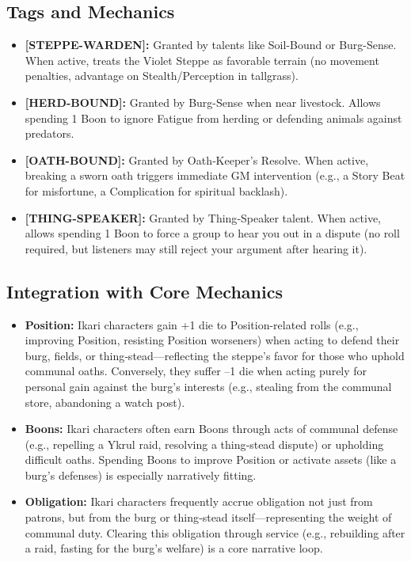 \documentclass[12pt]{article}
\begin{document}
\subsection{Tags and Mechanics}
\begin{itemize}[leftmargin=*]
  \item \textbf{[STEPPE-WARDEN]:} Granted by talents like Soil-Bound or Burg-Sense. When active, treats the Violet Steppe as favorable terrain (no movement penalties, advantage on Stealth/Perception in tallgrass).
  \item \textbf{[HERD-BOUND]:} Granted by Burg-Sense when near livestock. Allows spending 1 Boon to ignore Fatigue from herding or defending animals against predators.
  \item \textbf{[OATH-BOUND]:} Granted by Oath‑Keeper's Resolve. When active, breaking a sworn oath triggers immediate GM intervention (e.g., a Story Beat for misfortune, a Complication for spiritual backlash).
  \item \textbf{[THING-SPEAKER]:} Granted by Thing‑Speaker talent. When active, allows spending 1 Boon to force a group to hear you out in a dispute (no roll required, but listeners may still reject your argument after hearing it).
\end{itemize}

\subsection{Integration with Core Mechanics}
\begin{itemize}[leftmargin=*]
  \item \textbf{Position:} Ikari characters gain +1 die to Position-related rolls (e.g., improving Position, resisting Position worseners) when acting to defend their burg, fields, or thing‑stead---reflecting the steppe's favor for those who uphold communal oaths. Conversely, they suffer --1 die when acting purely for personal gain against the burg's interests (e.g., stealing from the communal store, abandoning a watch post).
  \item \textbf{Boons:} Ikari characters often earn Boons through acts of communal defense (e.g., repelling a Ykrul raid, resolving a thing‑stead dispute) or upholding difficult oaths. Spending Boons to improve Position or activate assets (like a burg's defenses) is especially narratively fitting.
  \item \textbf{Obligation:} Ikari characters frequently accrue obligation not just from patrons, but from the burg or thing‑stead itself---representing the weight of communal duty. Clearing this obligation through service (e.g., rebuilding after a raid, fasting for the burg's welfare) is a core narrative loop.
\end{itemize}
\end{document}
